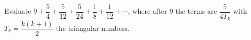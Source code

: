 Evaluate $9+\dfrac54+\dfrac5{12}+\dfrac5{24}+\dfrac18+\dfrac1{12}+\cdots$, where after $9$ the terms are $\dfrac5{4T_k}$ with $T_k=\dfrac{k(k+1)}2$ the triangular numbers.
